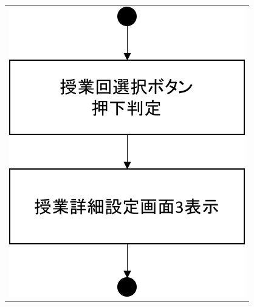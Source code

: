 \begin{figure}[htbp]
  \begin{tabular}{c}
 \begin{minipage}{0.33\hsize}
  \begin{center}
   \includegraphics[width=0.8\linewidth,clip]{./img/flow/46.png}
  \end{center}
 \end{minipage}
 \begin{minipage}{0.33\hsize}
  \begin{center}

\end{center}
\end{minipage}
\end{tabular}
\end{figure}
